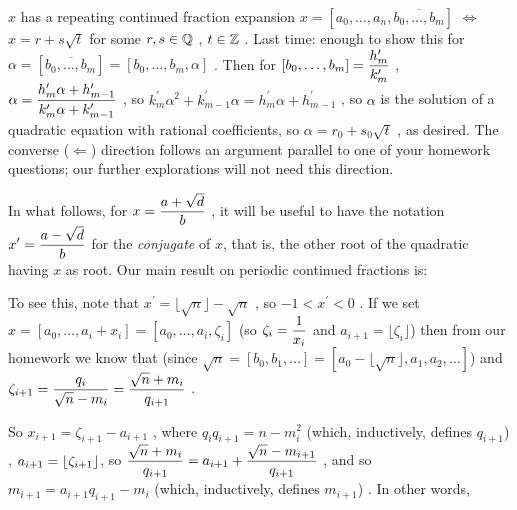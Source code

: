 $x$ has a repeating continued fraction expansion $x=[a_0,\ldots,a_n,\overline{b_0,\ldots,b_m}]$
$\Leftrightarrow$ $x=r+s\sqrt{t}$ for some $r,s\in{\Bbb Q}$ , $t\in{\Bbb Z}$ . \hsk
Last time: enough to show this for $\alpha=[\overline{b_0,\ldots,b_m}] = [b_0,\ldots,b_m,\alpha]$ . 
Then for $\displaystyle [b_0,\ldots,b_m] =
{{h_m^\prime}\over{k_m^\prime}}$ , $\displaystyle \alpha = 
{{h_m^\prime\alpha + h_{m-1}^\prime}\over{k_m^\prime\alpha + k_{m-1}^\prime}}$ , so
$k_m^\prime\alpha^2 + k_{m-1}^\prime\alpha = h_m^\prime\alpha + h_{m-1}^\prime$ ,
so $\alpha$ is the solution of a quadratic equation with rational coefficients, so $\alpha = r_0+s_0\sqrt{t}$ ,
as desired. \hhsk
The converse ($\Leftarrow$) direction follows an argument parallel to one of your homework
questions; our further explorations will not need this direction.

\ssk

In what follows, for $\displaystyle x={{a+\sqrt{d}}\over{b}}$ , it will be useful to have the
notation $\displaystyle x^\prime = {{a-\sqrt{d}}\over{b}}$ for the {\it conjugate} of $x$, that
is, the other root of the quadratic having $x$ as root. Our main result on periodic
continued fractions is:
\hhsk
{}

\ssk

To see this, note that $x^\prime = \lfloor \sqrt{n}\rfloor - \sqrt{n}$ , so $-1<x^\prime < 0$ .
If we set $x=[a_0,\ldots , a_i+x_i] = [a_0,\ldots , a_i,\zeta_i]$ (so $\displaystyle \zeta_i={{1}\over{x_i}}$  
and $a_{i+1} = \lfloor\zeta_i \rfloor$) then from our homework we know that (since
$\sqrt{n} = [b_0,b_1,\ldots] = [a_0-\lfloor\sqrt{n}\rfloor,a_1,a_2,\ldots]$) \hsk
{} and 
$\displaystyle \zeta_{i+1} = {{q_i}\over{\sqrt{n}-m_i}} = {{\sqrt{n}+m_i}\over{q_{i+1}}}$ . 

So
$x_{i+1} = \zeta_{i+1}-a_{i+1}$ , where $q_iq_{i+1} = n-m_i^2$ (which, inductively, defines
$q_{i+1}$) , 
$\displaystyle a_{i+1} = \lfloor\zeta_{i+1}\rfloor$, so 
$\displaystyle  {{\sqrt{n}+m_i}\over{q_{i+1}}} = a_{i+1} + {{\sqrt{n}-m_{i+1}}\over{q_{i+1}}}$ , and so
$m_{i+1} = a_{i+1}q_{i+1} - m_i$ (which, inductively, defines $m_{i+1}$) . 
In other words, 

\ssk

